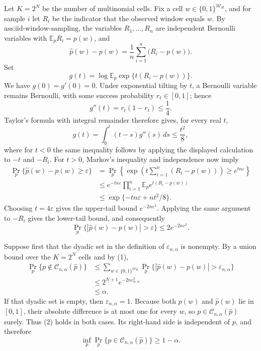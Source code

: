 Let \(K=2^N\) be the number of multinomial cells.  Fix a cell \(w\in\{0,1\}^{\mathcal W_H}\), and for sample \(i\) let \(R_i\) be the indicator that the observed window equals \(w\).  By \(\text{ass:iid-window-sampling}\), the variables \(R_1,\ldots,R_n\) are independent Bernoulli variables with \(\mathbb E_p R_i=p(w)\), and
\[
\widehat p(w)-p(w)=\frac1n\sum_{i=1}^n\bigl(R_i-p(w)\bigr).
\]
Set
\[
g(t)=\log\mathbb E_p\exp\{t(R_i-p(w))\}.
\]
We have \(g(0)=g'(0)=0\).  Under exponential tilting by \(t\), a Bernoulli variable remains Bernoulli, with some success probability \(r_t\in[0,1]\); hence
\[
g''(t)=r_t(1-r_t)\le\frac14.
\]
Taylor's formula with integral remainder therefore gives, for every real \(t\),
\[
g(t)=\int_0^t(t-s)g''(s)\,ds\le\frac{t^2}{8},
\]
where for \(t<0\) the same inequality follows by applying the displayed calculation to \(-t\) and \(-R_i\).  For \(t>0\), Markov's inequality and independence now imply
\[
\begin{aligned}
\Pr_p\{\widehat p(w)-p(w)\ge\varepsilon\}
&=\Pr_p\!\left\{\exp\!\left(t\sum_{i=1}^n(R_i-p(w))\right)
       \ge e^{tn\varepsilon}\right\}\\
&\le e^{-tn\varepsilon}\prod_{i=1}^n
       \mathbb E_p e^{t(R_i-p(w))}\\
&\le\exp\{-tn\varepsilon+nt^2/8\}.
\end{aligned}
\]
Choosing \(t=4\varepsilon\) gives the upper-tail bound \(e^{-2n\varepsilon^2}\).  Applying the same argument to \(-R_i\) gives the lower-tail bound, and consequently
\[
\Pr_p\{|\widehat p(w)-p(w)|>\varepsilon\}
\le 2e^{-2n\varepsilon^2}.
\tag{1}
\]

Suppose first that the dyadic set in the definition of \(\varepsilon_{n,\alpha}\) is nonempty.  By a union bound over the \(K=2^N\) cells and by (1),
\[
\begin{aligned}
\Pr_p\{p\notin\mathcal C_{n,\alpha}(\widehat p)\}
&\le\sum_{w\in\{0,1\}^{\mathcal W_H}}
  \Pr_p\{|\widehat p(w)-p(w)|>\varepsilon_{n,\alpha}\}\\
&\le 2^{N+1}e^{-2n\varepsilon_{n,\alpha}^2}\\
&\le\alpha.
\end{aligned}
\tag{2}
\]
If that dyadic set is empty, then \(\varepsilon_{n,\alpha}=1\).  Because both \(p(w)\) and \(\widehat p(w)\) lie in \([0,1]\), their absolute difference is at most one for every \(w\), so \(p\in\mathcal C_{n,\alpha}(\widehat p)\) surely.  Thus (2) holds in both cases.  Its right-hand side is independent of \(p\), and therefore
\[
\inf_p\Pr_p\{p\in\mathcal C_{n,\alpha}(\widehat p)\}\ge 1-\alpha.
\tag{3}
\]

